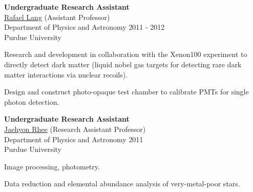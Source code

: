 
\Experience
{
	\textbf{Undergraduate Research Assistant}\\
	\href{http://www.physics.purdue.edu/people/faculty/lang.html}{Rafael Lang}
	(Assistant Professor)\\
	Department of Physics and Astronomy
}
{
	2011 - 2012\\
	Purdue University
}
{
	\item Research and development in collaboration with the Xenon100 experiment
	to directly detect dark matter (liquid nobel gas targets for detecting rare dark
	matter interactions via nuclear recoils).

	\item Design and construct photo-opaque test chamber to calibrate PMTs for single
	photon detection.
}






\Experience
{
	\textbf{Undergraduate Research Assistant}\\
	\href{http://www.physics.oregonstate.edu/~rheeja/}{Jaehyon Rhee}
	(Research Assistant Professor)\\
	Department of Physics and Astronomy
}
{
	2011\\
	Purdue University
}
{
	\item Image processing, photometry.
	\item Data reduction and elemental abundance analysis of very-metal-poor stars.
}
